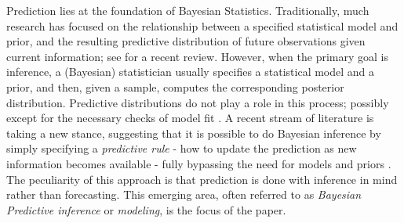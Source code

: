 \documentclass{article}
\theoremstyle{definition}
\renewcommand{\&}{and}
\begin{document}
\indent Prediction lies at the foundation of Bayesian Statistics. Traditionally, much research has focused on the relationship between a specified statistical model and prior, and the resulting predictive distribution of future observations given current information; see \cite{fortini2024exchangeability} for a recent review. However, when the primary goal is inference, a (Bayesian) statistician usually specifies a statistical model and a prior, and then, given a sample, computes the corresponding posterior distribution. Predictive distributions do not play a role in this process; possibly except for the necessary checks of model fit \citep[e.g. predictive checks,][]{gelman1996posterior}. A recent stream of literature is taking a new stance, suggesting that it is possible to do Bayesian inference by simply specifying a \textit{predictive rule} - how to update the prediction as new information becomes available - fully bypassing the need for models and priors \citep{fortini2020quasi,berti2021class,fong2021martingale,holmes2023statistical,fortini2023prediction}. The peculiarity of this approach is that prediction is done with inference in mind rather than forecasting. This emerging area, often referred to as \textit{Bayesian Predictive inference} or \textit{modeling}, is the focus of the paper. 

\end{document}
